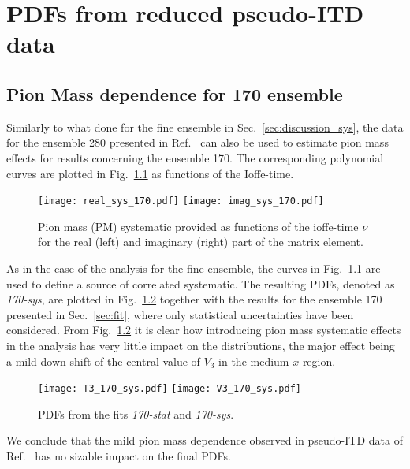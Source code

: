 \chapter{PDFs from reduced pseudo-ITD data}

\section{Pion Mass dependence for 170 ensemble}
Similarly to what done for the fine ensemble in Sec.~\ref{sec:discussion_sys},
the data for the ensemble 280 presented in Ref.~\cite{Joo:2020spy} can also be used to estimate pion mass effects
for results concerning the ensemble 170. The corresponding polynomial curves are plotted in Fig.~\ref{fig:sys_170}
as functions of the Ioffe-time.
\begin{figure}[h!]
    \centering
    \texttt{[image: real\_sys\_170.pdf]}  
    \texttt{[image: imag\_sys\_170.pdf]}
\caption{Pion mass (PM) systematic provided 
as functions of the ioffe-time $\nu$ for the real (left) and imaginary (right) part 
of the matrix element.}
\label{fig:sys_170}
\end{figure}

%
As in the case of the analysis for the fine ensemble, the curves in Fig.~\ref{fig:sys_170} are used 
to define a source of correlated systematic. The resulting PDFs, denoted as \textit{170-sys}, are 
plotted in Fig.~\ref{fig:res_170_sys} together with the results for the ensemble 170 presented in Sec.~\ref{sec:fit},
where only statistical uncertainties have been considered.
From Fig.~\ref{fig:res_170_sys} it is clear how introducing pion mass systematic effects in the analysis has very little impact on
the distributions, the major effect being a mild down shift of the central value of $V_3$ in the medium $x$ region.
\begin{figure}[h!]
    \centering
    \texttt{[image: T3\_170\_sys.pdf]}  
    \texttt{[image: V3\_170\_sys.pdf]}
\caption{PDFs from the fits \textit{170-stat} and \textit{170-sys}.}
\label{fig:res_170_sys}
\end{figure}
We conclude that the mild pion mass dependence observed in pseudo-ITD data of Ref.~\cite{Joo:2020spy} has no sizable impact
on the final PDFs.
